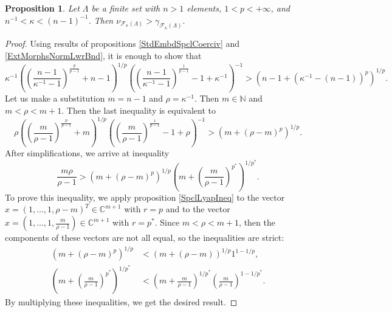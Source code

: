 \documentclass[12pt]{article}
\newtheorem{proposition}[theorem]{Proposition}
\begin{document}
\begin{proposition}\label{CompStdEmbdCoercvAndExtMorphsNormInf}
    Let $\Lambda$ be a finite set with $n>1$ elements, $1<p<+\infty$, 
    and $n^{-1}<\kappa<(n-1)^{-1}$. Then
    $
    \nu_{\mathcal{F}_{\kappa}(\Lambda)}
    >
    \gamma_{\mathcal{F}_{\kappa}(\Lambda)}.
    $
\end{proposition}
\begin{proof}
    Using results of propositions \ref{StdEmbdSpclCoerciv} 
    and \ref{ExtMorphsNormLwrBnd}, it is enough to show that
    \[
        \kappa^{-1}
        \left(
            \left(\frac{n-1}{\kappa^{-1}-1}
            \right)^{\frac{p}{p-1}}
            +n-1
        \right)^{1/p}
        \left(
            \left(\frac{n-1}{\kappa^{-1}-1}
            \right)^{\frac{1}{p-1}}
            -1+\kappa^{-1}
        \right)^{-1}
        >
        (n-1+(\kappa^{-1}-(n-1))^p)^{1/p}.
    \]
    Let us make a substitution $m=n-1$ and $\rho=\kappa^{-1}$. 
    Then $m\in\mathbb{N}$ and $m<\rho<m+1$. Then the last inequality is 
    equivalent to
    \[
        \rho
        \left(
        \left(\frac{m}{\rho-1}
            \right)^{\frac{p}{p-1}}
            +m
        \right)^{1/p}
        \left(
            \left(\frac{m}{\rho-1}
            \right)^{\frac{1}{p-1}}
            -1+\rho
        \right)^{-1}
        >
        (m+(\rho-m)^p)^{1/p}.
    \] 
    After simplifications, we arrive at inequality
    \[
        \frac{m\rho}{\rho-1}
        >
        (m+(\rho-m)^p)^{1/p}
        \left(
            m+\left(\frac{m}{\rho-1}\right)^{p^*}
        \right)^{1/p^*}.
    \]
    To prove this inequality, we apply proposition \ref{SpclLyapIneq} to the 
    vector $x=(1,\ldots,1,\rho-m)^T\in\mathbb{C}^{m+1}$ with $r=p$ and to the 
    vector $x=(1,\ldots,1,\frac{m}{\rho-1})\in\mathbb{C}^{m+1}$ with $r=p^*$. 
    Since $m<\rho<m+1$, then the components of these vectors are not all equal,
    so the inequalities are strict:
    \[
    \begin{aligned}
        (m+(\rho-m)^p)^{1/p}
        &<
        (m+(\rho-m))^{1/p} 1^{1-1/p},\\
        \left(m+\left(\frac{m}{\rho-1}\right)^{p^*}\right)^{1/p^*}
        &<
        \left(m+\frac{m}{\rho-1}\right)^{1/p^*}
        \left(\frac{m}{\rho-1}\right)^{1-1/p^*}.
    \end{aligned}
    \]
    By multiplying these inequalities, we get the desired result.
\end{proof}
\end{document}
